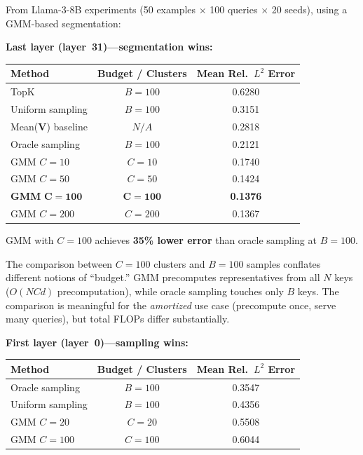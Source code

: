 \documentclass[11pt,a4paper]{article}
\theoremstyle{definition}
\begin{document}
From Llama-3-8B experiments (50 examples $\times$ 100 queries $\times$ 20
seeds), using a GMM-based segmentation:

\medskip
\noindent\textbf{Last layer (layer~31)---segmentation wins:}

\begin{center}
\begin{tabular}{lcc}
\toprule
Method & Budget / Clusters & Mean Rel.\ $L^2$ Error\\
\midrule
TopK              & $B=100$ & 0.6280\\
Uniform sampling  & $B=100$ & 0.3151\\
Mean($\mathbf{V}$) baseline & $N/A$ & 0.2818\\
Oracle sampling   & $B=100$ & 0.2121\\
GMM $C{=}10$      & $C=10$  & 0.1740\\
GMM $C{=}50$      & $C=50$  & 0.1424\\
\textbf{GMM} $\boldsymbol{C{=}100}$ & $\boldsymbol{C=100}$ &
  \textbf{0.1376}\\
GMM $C{=}200$     & $C=200$ & 0.1367\\
\bottomrule
\end{tabular}
\end{center}

GMM with $C=100$ achieves \textbf{35\% lower error} than oracle sampling at
$B=100$.

\begin{researchnote}
The comparison between $C=100$ clusters and $B=100$ samples conflates
different notions of ``budget.''  GMM precomputes representatives from all $N$
keys ($O(NCd)$ precomputation), while oracle sampling touches only $B$ keys.
The comparison is meaningful for the \emph{amortized} use case (precompute
once, serve many queries), but total FLOPs differ substantially.
\end{researchnote}

\medskip
\noindent\textbf{First layer (layer~0)---sampling wins:}

\begin{center}
\begin{tabular}{lcc}
\toprule
Method & Budget / Clusters & Mean Rel.\ $L^2$ Error\\
\midrule
Oracle sampling  & $B=100$ & 0.3547\\
Uniform sampling & $B=100$ & 0.4356\\
GMM $C{=}20$     & $C=20$  & 0.5508\\
GMM $C{=}100$    & $C=100$ & 0.6044\\
\bottomrule
\end{tabular}
\end{center}
\end{document}
